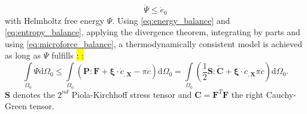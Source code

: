 \begin{equation} \label{eq:entropy_balance}
	\dot{\Psi}\leq\dot{e}_{0}
\end{equation}
with Helmholtz free energy $\Psi$. Using \eqref{eq:energy_balance} and \eqref{eq:entropy_balance}, applying the divergence theorem, integrating by parts and using \eqref{eq:microforce_balance}, a thermodynamically consistent model is achieved as long as $\Psi$ fulfills \hl{:  :}
\begin{equation} \label{eq:thermodyn_cons}
		\int\limits_{\Omega_{0}}\dot{\Psi}\mathrm{d}\Omega_{0} \leq \int\limits_{\Omega_{0}}\left(\mathbf{P}:\dot{\mathbf{F}}+\bm{\xi}\cdot\dot{c}_{,\mathbf{X}}-\pi\dot{c}\right)\mathrm{d}\Omega_{0} = \int\limits_{\Omega_{0}}\left(\dfrac{1}{2}\mathbf{S}:\dot{\mathbf{C}}+\bm{\xi}\cdot\dot{c}_{,\mathbf{X}}\pi\dot{c}\right)\mathrm{d}\Omega_{0}.
\end{equation}
$\mathbf{S}$ denotes the $2^{nd}$ Piola-Kirchhoff stress tensor and $\mathbf{C}=\mathbf{F}^{T}\mathbf{F}$ the right Cauchy-Green tensor.

